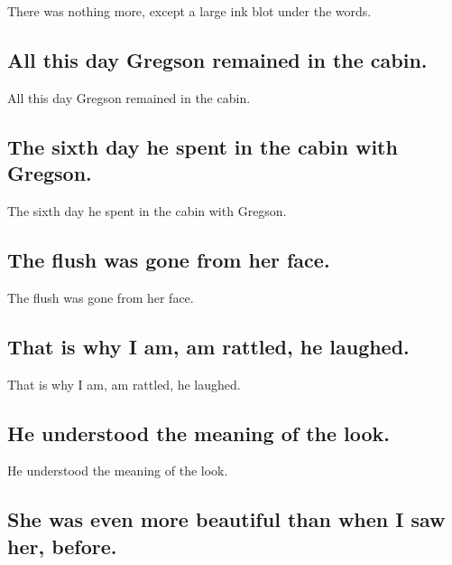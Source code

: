 \documentclass[]{article}
\begin{document}
There was nothing more, except a large ink blot under the words.

\hypertarget{all-this-day-gregson-remained-in-the-cabin.}{%
\subsection{All this day Gregson remained in the
cabin.}\label{all-this-day-gregson-remained-in-the-cabin.}}

All this day Gregson remained in the cabin.

\hypertarget{the-sixth-day-he-spent-in-the-cabin-with-gregson.}{%
\subsection{The sixth day he spent in the cabin with
Gregson.}\label{the-sixth-day-he-spent-in-the-cabin-with-gregson.}}

The sixth day he spent in the cabin with Gregson.

\hypertarget{the-flush-was-gone-from-her-face.}{%
\subsection{The flush was gone from her
face.}\label{the-flush-was-gone-from-her-face.}}

The flush was gone from her face.

\hypertarget{that-is-why-i-am-am-rattled-he-laughed.}{%
\subsection{That is why I am, am rattled, he
laughed.}\label{that-is-why-i-am-am-rattled-he-laughed.}}

That is why I am, am rattled, he laughed.

\hypertarget{he-understood-the-meaning-of-the-look.}{%
\subsection{He understood the meaning of the
look.}\label{he-understood-the-meaning-of-the-look.}}

He understood the meaning of the look.

\hypertarget{she-was-even-more-beautiful-than-when-i-saw-her-before.}{%
\subsection{She was even more beautiful than when I saw her,
before.}\label{she-was-even-more-beautiful-than-when-i-saw-her-before.}}
\end{document}
